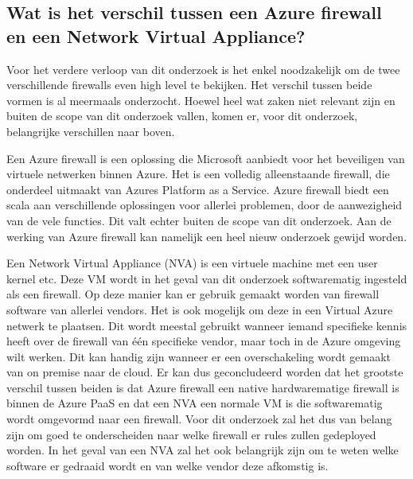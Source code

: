 \subsection*{Wat is het verschil tussen een Azure firewall en een Network Virtual Appliance?}
Voor het verdere verloop van dit onderzoek is het enkel noodzakelijk om de twee verschillende firewalls even high level te bekijken. 
Het verschil tussen beide vormen is al meermaals onderzocht. Hoewel heel wat zaken niet relevant zijn en buiten de scope van dit onderzoek vallen, komen er, voor dit onderzoek, belangrijke verschillen naar boven.

Een Azure firewall is een oplossing die Microsoft aanbiedt voor het beveiligen van virtuele netwerken binnen Azure. \autocite{Cooke} Het is een volledig alleenstaande firewall, die onderdeel uitmaakt van Azures Platform as a Service. \newline \autocite{Seferlis2018} Azure firewall biedt een scala aan verschillende oplossingen voor allerlei problemen, door de aanwezigheid van de vele functies. Dit valt echter buiten de scope van dit onderzoek. Aan de werking van Azure firewall kan namelijk een heel nieuw onderzoek gewijd worden.

Een Network Virtual Appliance (NVA) is een virtuele machine met een user kernel etc. Deze VM wordt in het geval van dit onderzoek softwarematig ingesteld als een firewall. \autocite{Awati} Op deze manier kan er gebruik gemaakt worden van firewall software van allerlei vendors. Het is ook mogelijk om deze in een Virtual Azure netwerk te plaatsen. Dit wordt meestal gebruikt wanneer iemand specifieke kennis heeft over de firewall van één specifieke vendor, maar toch in de Azure omgeving wilt werken. Dit kan handig zijn wanneer er een overschakeling wordt gemaakt van on premise naar de cloud. 
\autocite{Aviatrix} Er kan dus geconcludeerd worden dat het grootste verschil tussen beiden is dat Azure firewall een native hardwarematige firewall is binnen de Azure PaaS en dat een NVA een normale VM is die softwarematig wordt omgevormd naar een firewall. Voor dit onderzoek zal het dus van belang zijn om goed te onderscheiden naar welke firewall er rules zullen gedeployed worden. In het geval van een NVA zal het ook belangrijk zijn om te weten welke software er gedraaid wordt en van welke vendor deze afkomstig is. 

